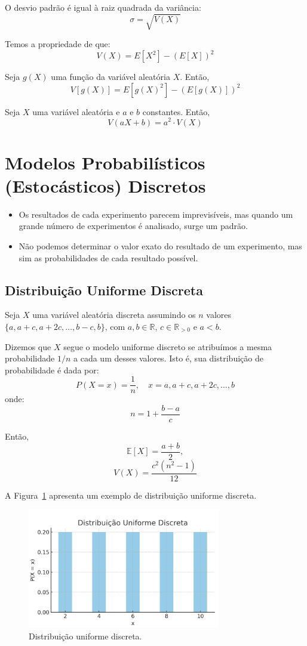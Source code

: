 \documentclass{article}
\begin{document}
O desvio padrão é igual à raiz quadrada da variância:
    $$
    \sigma = \sqrt{V(X)}
    $$

Temos a propriedade de que:
    $$
    V(X) = E[X^2] - (E[X])^2
    $$

Seja $g(X)$ uma função da variável aleatória $X$. Então,
    $$
    V[g(X)] = E[g(X)^2] - \left(E[g(X)]\right)^2
    $$

Seja $X$ uma variável aleatória e $a$ e $b$ constantes. Então,
    $$
    V(aX + b) = a^2 \cdot V(X)
    $$

\section{Modelos Probabilísticos (Estocásticos) Discretos}
\begin{itemize}
    \item Os resultados de cada experimento parecem imprevisíveis, mas quando um grande número de experimentos é analisado, surge um padrão.
    \item Não podemos determinar o valor exato do resultado de um experimento, mas sim as probabilidades de cada resultado possível.
\end{itemize}

\subsection{Distribuição Uniforme Discreta}
Seja $X$ uma variável aleatória discreta assumindo os $n$ valores  $\{a, a + c, a + 2c, \ldots, b - c, b\}$,  com $a, b \in \mathbb{R}$, $c \in \mathbb{R}_{> 0}$ e $a < b$.

Dizemos que $X$ segue o modelo uniforme discreto se atribuímos a mesma probabilidade $1/n$ a cada um desses valores.  
Isto é, sua distribuição de probabilidade é dada por:
    $$
    P(X = x) = \frac{1}{n}, \quad x = a, a + c, a + 2c, \ldots, b
    $$
onde:
    $$
    n = 1 + \frac{b - a}{c}
    $$

Então,
    $$
    \mathbb{E}[X] = \frac{a + b}{2},
    $$
    $$
    V(X) = \frac{c^2(n^2 - 1)}{12}
    $$

A Figura~\ref{fig:dist_disc_uniforme} apresenta um exemplo de distribuição uniforme discreta.

\begin{figure}[H]
    \centering
    \includegraphics[width=0.75\textwidth]{figuras/dist_disc_uniforme.png}
    \caption{Distribuição uniforme discreta.}
    \label{fig:dist_disc_uniforme}
\end{figure}
\end{document}
